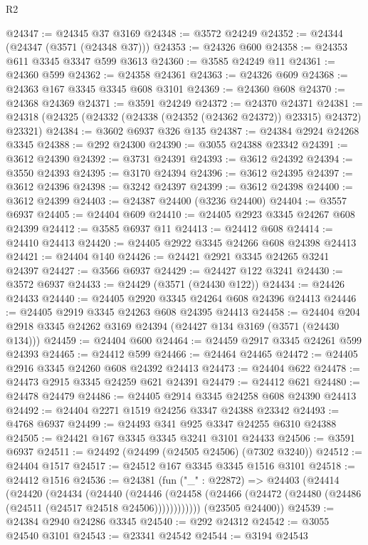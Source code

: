 \begin{lexlean}{R2}
\begin{coremodule}
@24347 := @24345 @37 @3169
@24348 := @3572 @24249
@24352 := @24344 (@24347 (@3571 (@24348 @37)))
@24353 := @24326 @600
@24358 := @24353 @611 @3345 @3347 @599 @3613
@24360 := @3585 @24249 @11
@24361 := @24360 @599
@24362 := @24358 @24361
@24363 := @24326 @609
@24368 := @24363 @167 @3345 @3345 @608 @3101
@24369 := @24360 @608
@24370 := @24368 @24369
@24371 := @3591 @24249
@24372 := @24370 @24371
@24381 := @24318 (@24325 (@24332 (@24338 (@24352 (@24362 @24372)) @23315) @24372) @23321)
@24384 := @3602 @6937 @326 @135
@24387 := @24384 @2924 @24268 @3345
@24388 := @292 @24300
@24390 := @3055 @24388 @23342
@24391 := @3612 @24390
@24392 := @3731 @24391
@24393 := @3612 @24392
@24394 := @3550 @24393
@24395 := @3170 @24394
@24396 := @3612 @24395
@24397 := @3612 @24396
@24398 := @3242 @24397
@24399 := @3612 @24398
@24400 := @3612 @24399
@24403 := @24387 @24400 (@3236 @24400)
@24404 := @3557 @6937
@24405 := @24404 @609
@24410 := @24405 @2923 @3345 @24267 @608 @24399
@24412 := @3585 @6937 @11
@24413 := @24412 @608
@24414 := @24410 @24413
@24420 := @24405 @2922 @3345 @24266 @608 @24398 @24413
@24421 := @24404 @140
@24426 := @24421 @2921 @3345 @24265 @3241 @24397
@24427 := @3566 @6937
@24429 := @24427 @122 @3241
@24430 := @3572 @6937
@24433 := @24429 (@3571 (@24430 @122))
@24434 := @24426 @24433
@24440 := @24405 @2920 @3345 @24264 @608 @24396 @24413
@24446 := @24405 @2919 @3345 @24263 @608 @24395 @24413
@24458 := @24404 @204 @2918 @3345 @24262 @3169 @24394 (@24427 @134 @3169 (@3571 (@24430 @134)))
@24459 := @24404 @600
@24464 := @24459 @2917 @3345 @24261 @599 @24393
@24465 := @24412 @599
@24466 := @24464 @24465
@24472 := @24405 @2916 @3345 @24260 @608 @24392 @24413
@24473 := @24404 @622
@24478 := @24473 @2915 @3345 @24259 @621 @24391
@24479 := @24412 @621
@24480 := @24478 @24479
@24486 := @24405 @2914 @3345 @24258 @608 @24390 @24413
@24492 := @24404 @2271 @1519 @24256 @3347 @24388 @23342
@24493 := @4768 @6937
@24499 := @24493 @341 @925 @3347 @24255 @6310 @24388
@24505 := @24421 @167 @3345 @3345 @3241 @3101 @24433
@24506 := @3591 @6937
@24511 := @24492 (@24499 (@24505 @24506) (@7302 @3240))
@24512 := @24404 @1517
@24517 := @24512 @167 @3345 @3345 @1516 @3101
@24518 := @24412 @1516
@24536 := @24381
    (fun ("_" : @22872) =>
    @24403
      (@24414
        (@24420
          (@24434
            (@24440
              (@24446
                (@24458 (@24466 (@24472 (@24480 (@24486 (@24511 (@24517 @24518 @24506))))))))))))
      (@23505 @24400))
@24539 := @24384 @2940 @24286 @3345
@24540 := @292 @24312
@24542 := @3055 @24540 @3101
@24543 := @23341 @24542
@24544 := @3194 @24543

\end{coremodule}
\end{lexlean}
